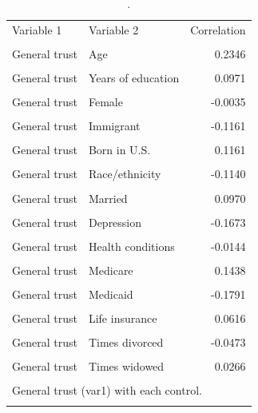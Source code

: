 \begin{table}[htbp]\centering
\caption{.}
\label{tab:trust_controls_corr}
\begin{tabular}{llr}\toprule
Variable 1 & Variable 2 & Correlation \\\\ \midrule
General trust & Age & 0.2346 \\\\
General trust & Years of education & 0.0971 \\\\
General trust & Female & -0.0035 \\\\
General trust & Immigrant & -0.1161 \\\\
General trust & Born in U.S. & 0.1161 \\\\
General trust & Race/ethnicity & -0.1140 \\\\
General trust & Married & 0.0970 \\\\
General trust & Depression & -0.1673 \\\\
General trust & Health conditions & -0.0144 \\\\
General trust & Medicare & 0.1438 \\\\
General trust & Medicaid & -0.1791 \\\\
General trust & Life insurance & 0.0616 \\\\
General trust & Times divorced & -0.0473 \\\\
General trust & Times widowed & 0.0266 \\\\
\bottomrule
\multicolumn{3}{l}{\footnotesize General trust (var1) with each control.} \\\\
\end{tabular}\end{table}
